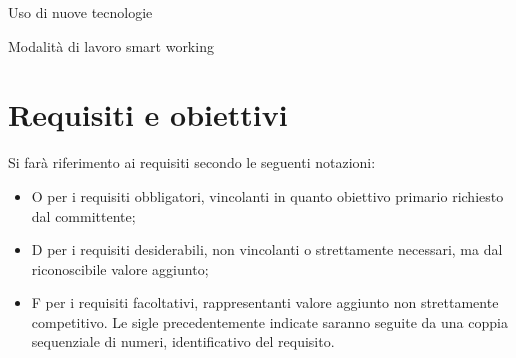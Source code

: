 \begin{risk}{Uso di nuove tecnologie}
  \label{risk:new-tecnology}
\end{risk}
\begin{risk}{Modalità di lavoro smart working}
  \label{risk:smart-working}
\end{risk}

\section{Requisiti e obiettivi}

Si farà riferimento ai requisiti secondo le seguenti notazioni:
\begin{itemize}
  \item O per i requisiti obbligatori, vincolanti in quanto obiettivo primario richiesto dal committente;
  \item D per i requisiti desiderabili, non vincolanti o strettamente necessari, ma dal riconoscibile valore aggiunto;
  \item F per i requisiti facoltativi, rappresentanti valore aggiunto non strettamente competitivo.
        Le sigle precedentemente indicate saranno seguite da una coppia sequenziale di numeri, identificativo del requisito.
\end{itemize}

